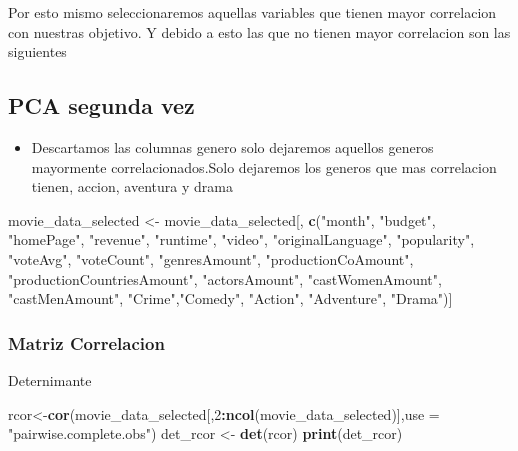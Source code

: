 \documentclass[
]{article}
\newenvironment{Shaded}{\begin{snugshade}}{\end{snugshade}}
\newcommand{\AttributeTok}[1]{\textcolor[rgb]{0.13,0.29,0.53}{#1}}
\newcommand{\DecValTok}[1]{\textcolor[rgb]{0.00,0.00,0.81}{#1}}
\newcommand{\FunctionTok}[1]{\textcolor[rgb]{0.13,0.29,0.53}{\textbf{#1}}}
\newcommand{\NormalTok}[1]{#1}
\newcommand{\OtherTok}[1]{\textcolor[rgb]{0.56,0.35,0.01}{#1}}
\newcommand{\SpecialCharTok}[1]{\textcolor[rgb]{0.81,0.36,0.00}{\textbf{#1}}}
\newcommand{\StringTok}[1]{\textcolor[rgb]{0.31,0.60,0.02}{#1}}
\providecommand{\tightlist}{%
  \setlength{\itemsep}{0pt}\setlength{\parskip}{0pt}}
\begin{document}
Por esto mismo seleccionaremos aquellas variables que tienen mayor
correlacion con nuestras objetivo. Y debido a esto las que no tienen
mayor correlacion son las siguientes

\subsection{PCA segunda vez}\label{pca-segunda-vez}

\begin{itemize}
\tightlist
\item
  Descartamos las columnas genero solo dejaremos aquellos generos
  mayormente correlacionados.Solo dejaremos los generos que mas
  correlacion tienen, accion, aventura y drama
\end{itemize}

\begin{Shaded}
\begin{Highlighting}[]
\NormalTok{movie\_data\_selected }\OtherTok{\textless{}{-}}\NormalTok{ movie\_data\_selected[, }\FunctionTok{c}\NormalTok{(}\StringTok{"month"}\NormalTok{, }\StringTok{"budget"}\NormalTok{, }\StringTok{"homePage"}\NormalTok{, }\StringTok{"revenue"}\NormalTok{, }\StringTok{"runtime"}\NormalTok{, }\StringTok{"video"}\NormalTok{, }\StringTok{"originalLanguage"}\NormalTok{, }\StringTok{"popularity"}\NormalTok{, }\StringTok{"voteAvg"}\NormalTok{, }\StringTok{"voteCount"}\NormalTok{, }\StringTok{"genresAmount"}\NormalTok{, }\StringTok{"productionCoAmount"}\NormalTok{, }\StringTok{"productionCountriesAmount"}\NormalTok{, }\StringTok{"actorsAmount"}\NormalTok{, }\StringTok{"castWomenAmount"}\NormalTok{, }\StringTok{"castMenAmount"}\NormalTok{, }\StringTok{"Crime"}\NormalTok{,}\StringTok{"Comedy"}\NormalTok{, }\StringTok{"Action"}\NormalTok{, }\StringTok{"Adventure"}\NormalTok{, }\StringTok{"Drama"}\NormalTok{)]}
\end{Highlighting}
\end{Shaded}

\subsubsection{Matriz Correlacion}\label{matriz-correlacion}

Deternimante

\begin{Shaded}
\begin{Highlighting}[]
\NormalTok{rcor}\OtherTok{\textless{}{-}}\FunctionTok{cor}\NormalTok{(movie\_data\_selected[,}\DecValTok{2}\SpecialCharTok{:}\FunctionTok{ncol}\NormalTok{(movie\_data\_selected)],}\AttributeTok{use =} \StringTok{"pairwise.complete.obs"}\NormalTok{)}
\NormalTok{det\_rcor }\OtherTok{\textless{}{-}} \FunctionTok{det}\NormalTok{(rcor)}
\FunctionTok{print}\NormalTok{(det\_rcor)}
\end{Highlighting}
\end{Shaded}
\end{document}
